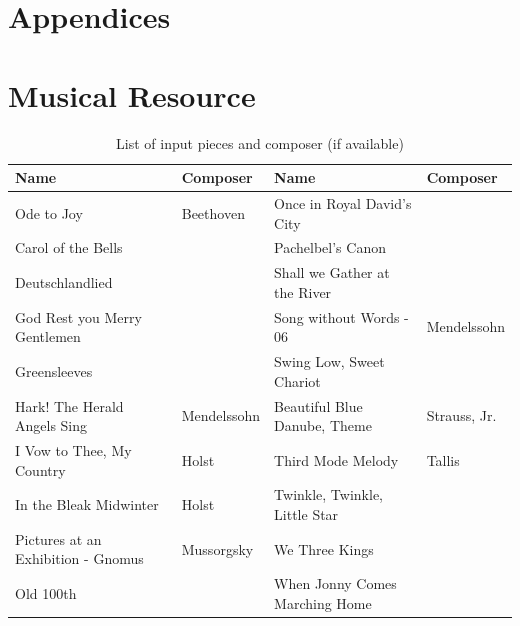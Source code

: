 \documentclass[10pt, oneside]{article}
\begin{document}
\newpage
\appendix
\section*{Appendices}
\label{appendix:a}


\section{Musical Resource}
\label{appendix:b}

\begin{table}[!htbp]
\centering
\begin{tabular}{|l|l|l|l|}
\hline
Name                               & Composer    & Name                           & Composer     \\ \hline
Ode to Joy                         & Beethoven   & Once in Royal David's City     &              \\ \hline
Carol of the Bells                 &             & Pachelbel's Canon              &              \\ \hline
Deutschlandlied                    &             & Shall we Gather at the River   &              \\ \hline
God Rest you Merry Gentlemen       &             & Song without Words - 06        & Mendelssohn  \\ \hline
Greensleeves                       &             & Swing Low, Sweet Chariot       &              \\ \hline
Hark! The Herald Angels Sing       & Mendelssohn & Beautiful Blue Danube, Theme   & Strauss, Jr. \\ \hline
I Vow to Thee, My Country          & Holst       & Third Mode Melody              & Tallis       \\ \hline
In the Bleak Midwinter             & Holst       & Twinkle, Twinkle, Little Star  &              \\ \hline
Pictures at an Exhibition - Gnomus & Mussorgsky  & We Three Kings                 &              \\ \hline
Old 100th                          &             & When Jonny Comes Marching Home &              \\ \hline
\end{tabular}
\caption{List of input pieces and composer (if available)}
\end{table}
\end{document}

